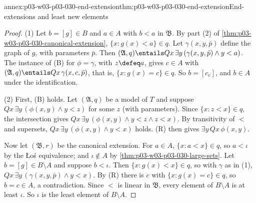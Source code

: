 \begin{annexitem}{annex:p03-w03-p03-030-end-extension}{thm:p03-w03-p03-030-end-extension}{End-extensions and least new elements}
\begin{proof}
(1) Let \(b=[g]\in B\) and \(a\in A\) with \(b<a\) in \(\mathfrak B\).  By
part (2) of \cref{thm:p03-w03-p03-030-canonical-extension},
\(\{x:g(x)<a\}\in q\).  Let \(\gamma(x,y,\bar p)\) define the graph of \(g\),
with parameters \(\bar p\).  Then \((\mathfrak A,q)\entails Qx\,\exists
y\,(\gamma(x,y,\bar p)\wedge y<a)\).  The instance of (B) for
\(\phi=\gamma\), with \(z\defeq a\), gives \(c\in A\) with
\((\mathfrak A,q)\entails Qx\,\gamma(x,c,\bar p)\), that is,
\(\{x:g(x)=c\}\in q\).  So \(b=[c_c]\), and \(b\in A\) under the
identification.

(2) First, (B) holds.  Let \((\mathfrak A,q)\) be a model of \(T\) and
suppose \(Qx\,\exists y\,(\phi(x,y)\wedge y<z)\) for some \(z\) (with
parameters).  Since \(\{x:z<x\}\in q\), the intersection gives
\(Qx\,\exists y\,(\phi(x,y)\wedge y<z\wedge z<x)\).  By transitivity of
\(<\) and supersets, \(Qx\,\exists y\,(\phi(x,y)\wedge y<x)\) holds.  (R) then
gives \(\exists y\,Qx\,\phi(x,y)\).

Now let \((\mathfrak B,r)\) be the canonical extension.  For \(a\in A\),
\(\{x:a<x\}\in q\), so \(a<\iota\) by the \L o\'s equivalence; and
\(\iota\notin A\) by \cref{thm:p03-w03-p03-030-large-sets}.  Let \(b=[g]\in
B\setminus A\) and suppose \(b<\iota\).  Then \(\{x:g(x)<x\}\in q\), so with
\(\gamma\) as in (1), \(Qx\,\exists y\,(\gamma(x,y,\bar p)\wedge y<x)\).  By (R)
there is \(c\) with \(\{x:g(x)=c\}\in q\), so \(b=c\in A\), a contradiction.
Since \(<\) is linear in \(\mathfrak B\), every element of \(B\setminus A\) is
at least \(\iota\).  So \(\iota\) is the least element of \(B\setminus A\).
\end{proof}
\end{annexitem}

